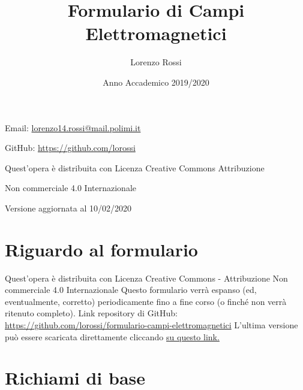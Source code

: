 \documentclass{article}
\title{\Huge Formulario di Campi Elettromagnetici}
\author{\LARGE Lorenzo Rossi}
\date{\LARGE Anno Accademico 2019/2020}
\begin{document}
\maketitle

\vspace{18em}

\large
\begin{doublespacing}\hypersetup{
		urlcolor=black,
	}
	\centerline{Email: \href{mailto://lorenzo14.rossi@mail.polimi.it}{lorenzo14.rossi@mail.polimi.it}}
	\centerline{GitHub: \url{https://github.com/lorossi}}

	\vspace{18em}
	\centerline{Quest'opera è distribuita con Licenza Creative Commons Attribuzione}
	\centerline{Non commerciale 4.0 Internazionale \ccbynceu}
	\centerline{Versione aggiornata al 10/02/2020}
\end{doublespacing}
\newpage


\tableofcontents
\clearpage
{}
\newpage

\section{Riguardo al formulario}
Quest'opera è distribuita con Licenza Creative Commons - Attribuzione Non commerciale 4.0 Internazionale \ccbynceu \newline
Questo formulario verrà espanso (ed, eventualmente, corretto) periodicamente fino a fine corso (o finché non verrà ritenuto completo). \newline
Link repository di GitHub: \url{https://github.com/lorossi/formulario-campi-elettromagnetici} \newline
L'ultima versione può essere scaricata direttamente cliccando \href{https://github.com/lorossi/formulario-campi-elettromagnetici/raw/master/formulario_campi.pdf}{su questo link.}

\section{Richiami di base}
\end{document}
